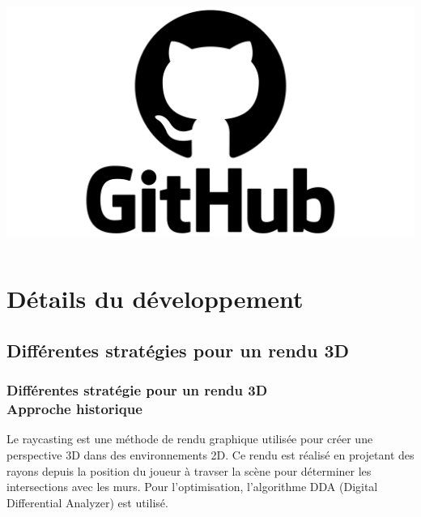 \documentclass{beamer}
\begin{document}
\begin{frame}
\begin{columns}
        \centering
        \includegraphics[width=\textwidth]{images/github.png}
    \end{columns}
\end{frame}

\section{Détails du développement}
\subsection{Différentes stratégies pour un rendu 3D}

\begin{frame}
    \frametitle{Différentes stratégie pour un rendu 3D \\
                \small Approche historique}
    \begin{block}{}
        Le raycasting est une méthode de rendu graphique utilisée pour créer 
        une perspective 3D dans des environnements 2D. Ce rendu est réalisé
        en projetant des rayons depuis la position du joueur à travser la scène
        pour déterminer les intersections avec les murs. Pour l'optimisation,
        l'algorithme DDA (Digital Differential Analyzer) est utilisé.
    \end{block}
\end{frame}
\end{document}
